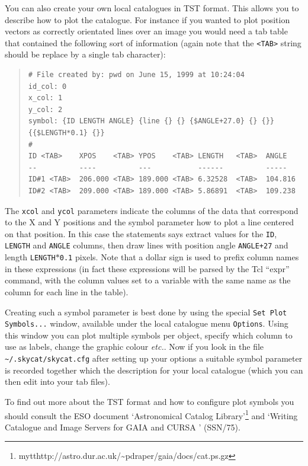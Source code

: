 \documentclass[twoside,11pt]{article}
\newcommand{\htmladdnormallinkfoot}[2]{#1\footnote{#2}}
\newcommand{\xref}[3]{#1}
\renewcommand{\_}{\texttt{\symbol{95}}}
\newcommand{\mytt}[1]{{\texttt{#1}}}
\begin{document}
You can also create your own local catalogues in TST format. This
allows you to describe how to plot the catalogue. For instance if you
wanted to plot position vectors as correctly orientated lines over an
image you would need a tab table that contained the following sort of
information (again note that the \mytt{<TAB>} string should be replace
by a single tab character):
\begin{quote}
\begin{verbatim}
# File created by: pwd on June 15, 1999 at 10:24:04
id_col: 0
x_col: 1
y_col: 2
symbol: {ID LENGTH ANGLE} {line {} {} {$ANGLE+27.0} {} {}} {{$LENGTH*0.1} {}}
#
ID <TAB>    XPOS    <TAB> YPOS    <TAB> LENGTH   <TAB>  ANGLE
--          ----          ---           ------          -----
ID#1 <TAB>  206.000 <TAB> 189.000 <TAB> 6.32528  <TAB>  104.816
ID#2 <TAB>  209.000 <TAB> 189.000 <TAB> 5.86891  <TAB>  109.238
\end{verbatim}
\end{quote}
The \mytt{x\_col} and \mytt{y\_col} parameters indicate the columns of
the data that correspond to the X and Y positions and the symbol
parameter how to plot a line centered on that position. In this case
the statements says extract values for the \mytt{ID}, \mytt{LENGTH}
and \mytt{ANGLE} columns, then draw lines with position angle
\mytt{ANGLE+27} and length \mytt{LENGTH$*$0.1} pixels. Note that a
dollar sign is used to prefix column names in these expressions (in
fact these expressions will be parsed by the Tcl ``expr'' command,
with the column values set to a variable with the same name as the
column for each line in the table).

Creating such a symbol parameter is best done by using the special
\mytt{Set Plot Symbols...} window, available under the local catalogue
menu \mytt{Options}. Using this window you can plot multiple symbols per
object, specify which column to use as labels, change the graphic
colour {\em etc.}. Now if you look in the file
\mytt{\~{}/.skycat/skycat.cfg} after setting up your options a suitable
symbol parameter is recorded together which the description for your
local catalogue (which you can then edit into your tab files).

To find out more about the TST format and how to configure plot
symbols you should consult the ESO document
\htmladdnormallinkfoot{`Astronomical Catalog Library'}
{mytt{http://astro.dur.ac.uk/\~{}pdraper/gaia/docs/cat.ps.gz}} and
`Writing Catalogue and Image Servers for GAIA and CURSA '
(\xref{SSN/75}{ssn75}{}).
\end{document}
